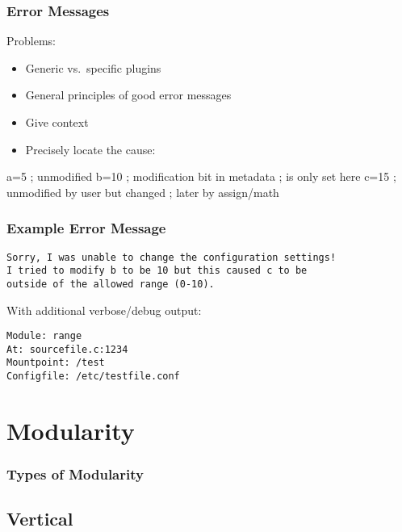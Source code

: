 \begin{frame}[fragile]
	\frametitle{Error Messages}

	Problems:
	\begin{itemize}[<+-| alert@+>]
	\item Generic vs.\ specific plugins
	\item General principles of good error messages~\cite{lee2011personifying}
	\item Give context
	\item Precisely locate the cause:
	\end{itemize}
	\vspace{1em}

	\pause[\thebeamerpauses]

	\begin{code}[language=CfgElektra,gobble=4]
	a=5  ; unmodified
	b=10 ; modification bit in metadata
	     ; is only set here
	c=15 ; unmodified by user but changed
	     ; later by assign/math
	\end{code}
\end{frame}

\begin{frame}[fragile]
	\frametitle{Example Error Message}
\begin{verbatim}
Sorry, I was unable to change the configuration settings!
I tried to modify b to be 10 but this caused c to be
outside of the allowed range (0-10).
\end{verbatim}
With additional verbose/debug output:
\begin{verbatim}
Module: range
At: sourcefile.c:1234
Mountpoint: /test
Configfile: /etc/testfile.conf
\end{verbatim}
\end{frame}




\section{Modularity}


\begin{frame}
	\frametitle{Types of Modularity}
	\Large
\end{frame}

\subsection{Vertical}

